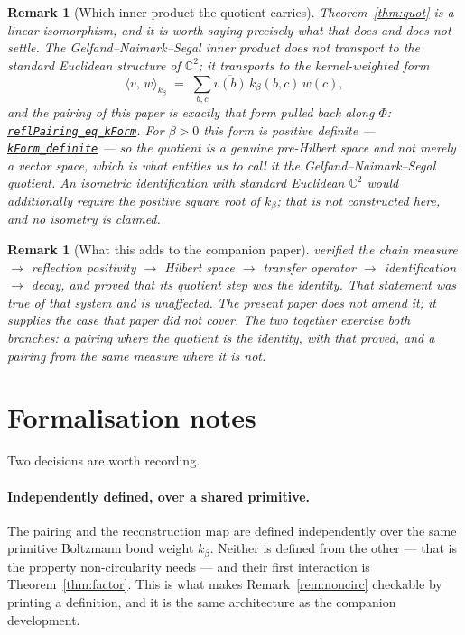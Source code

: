 \documentclass[11pt]{article}
\newtheorem{remark}[theorem]{Remark}
\theoremstyle{definition}
\newcommand{\anchor}{673d1df122ac7110e6f7b52795b44a02d38d8d24}
\newcommand{\osline}[3]{%
  \href{https://github.com/lluiseriksson/THE-ERIKSSON-PROGRAMME/blob/\anchor/YangMills/OS/#1.lean\#L#2}{\nolinkurl{#3}}}
\newcommand{\C}{\mathbb{C}}
\newcommand{\inn}[2]{\langle #1,\, #2\rangle}
\begin{document}
\begin{remark}[Which inner product the quotient carries]\label{rem:inner}
Theorem~\ref{thm:quot} is a \emph{linear} isomorphism, and it is worth saying
precisely what that does and does not settle.  The Gelfand--Naimark--Segal
inner product does not transport to the standard Euclidean structure of
$\C^2$; it transports to the kernel-weighted form
\[
  \inn{v}{w}_{k_\beta} \;=\; \sum_{b,c} \overline{v(b)}\, k_\beta(b,c)\, w(c),
\]
and the pairing of this paper is exactly that form pulled back along $\Phi$:
\osline{Z2Quotient}{304}{reflPairing\_eq\_kForm}.  For $\beta>0$ this form is
positive definite --- \osline{Z2Quotient}{336}{kForm\_definite} --- so the
quotient is a genuine pre-Hilbert space and not merely a vector space, which
is what entitles us to call it the Gelfand--Naimark--Segal quotient.  An
\emph{isometric} identification with standard Euclidean $\C^2$ would
additionally require the positive square root of $k_\beta$; that is not
constructed here, and no isometry is claimed.
\end{remark}
\begin{remark}[What this adds to the companion paper]
\cite{ErikssonOSChain} verified the chain
measure $\to$ reflection positivity $\to$ Hilbert space $\to$ transfer operator
$\to$ identification $\to$ decay, and proved that \emph{its} quotient step was
the identity.  That statement was true of that system and is unaffected.  The
present paper does not amend it; it supplies the case that paper did not cover.
The two together exercise both branches: a pairing where the quotient is the
identity, with that proved, and a pairing from the same measure where it is not.
\end{remark}

\section{Formalisation notes}

Two decisions are worth recording.

\paragraph{Independently defined, over a shared primitive.}  The pairing and
the reconstruction map are defined independently over the same primitive
Boltzmann bond weight $k_\beta$.  Neither is defined from the other --- that is
the property non-circularity needs --- and their first interaction is
Theorem~\ref{thm:factor}.  This is what makes
Remark~\ref{rem:noncirc} checkable by printing a definition, and it is the same
architecture as the companion development.
\end{document}
